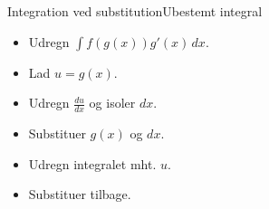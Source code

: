 \begin{frame}{Integration ved substitution}{Ubestemt integral}
\begin{minipage}{0.45\textwidth}
	\begin{itemize}
		\setlength\itemsep{1em}
		\item<1-> Udregn $\int f(g(x))g'(x)\, dx$.
		\item<2-> Lad $u=g(x)$.
		\item<3-> Udregn $\frac{du}{dx}$ og isoler $dx$.
		\item<4-> Substituer $g(x)$ og $dx$.
		\item<5-> Udregn integralet mht. $u$.
		\item<6-> Substituer tilbage.
	\end{itemize}
\end{minipage}
\end{frame}

